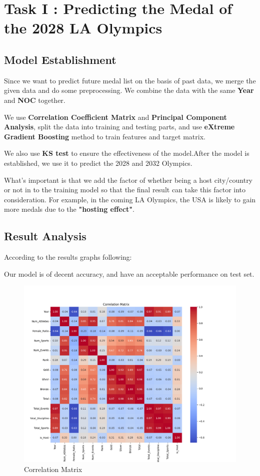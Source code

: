 \section{Task I : Predicting the Medal of the 2028 LA Olympics}
\subsection{Model Establishment}
Since we want to predict future medal list on the basis of past data, we merge the given data and do some preprocessing. 
We combine the data with the same \textbf{Year} and \textbf{NOC} together.

We use \textbf{Correlation Coefficient Matrix} and \textbf{Principal Component Analysis}, split the data
into training and testing parts, and use \textbf{eXtreme Gradient Boosting} method to train features
and target matrix.

We also use \textbf{KS test} to ensure the effectiveness of the model.After the model is established, we use it to predict the 2028 and 2032 Olympics.

What's important is that we add the factor of whether being a host city/country or not in to the training model so that the final result can take this factor into consideration. For example,
in the coming LA Olympics, the USA is likely to gain more medals due to the \textbf{"hosting effect"}.\cite{davis2018impact}

\subsection{Result Analysis}


According to the results graphs following:

Our model is of decent accuracy, and have an acceptable performance on test set.


\begin{figure}[htbp]
    \centering
    \includegraphics[width=1\textwidth]{./figures/Cor_Matrix.png}
    \caption{Correlation Matrix}
    \label{fig:Cor_Matrix}
\end{figure}

